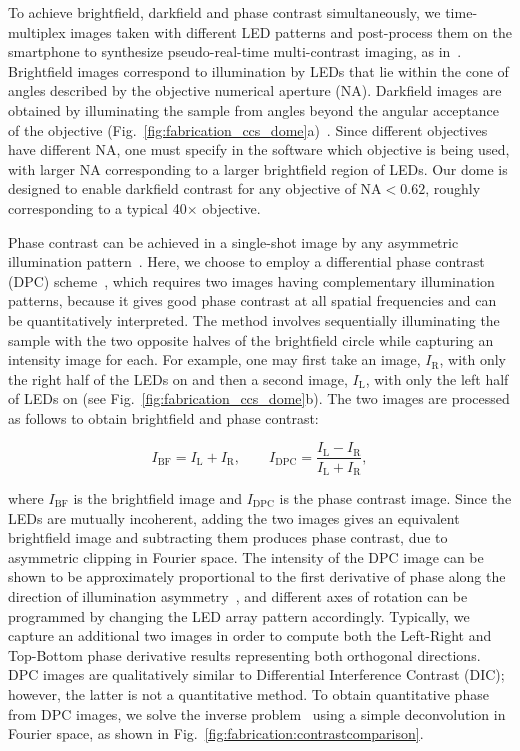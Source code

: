 To achieve brightfield, darkfield and phase contrast simultaneously, we time-multiplex images taken with different LED patterns and post-process them on the smartphone to synthesize pseudo-real-time multi-contrast imaging, as in~\cite{zijiMulti}. Brightfield images correspond to illumination by LEDs that lie within the cone of angles described by the objective numerical aperture (NA). Darkfield images are obtained by illuminating the sample from angles beyond the angular acceptance of the objective (Fig.~\ref{fig:fabrication_ccs_dome}a)~\cite{Zheng2011}. Since different objectives have different NA, one must specify in the software which objective is being used, with larger NA corresponding to a larger brightfield region of LEDs. Our dome is designed to enable darkfield contrast for any objective of NA$<0.62$, roughly corresponding to a typical 40$\times$ objective.

Phase contrast can be achieved in a single-shot image by any asymmetric illumination pattern~\cite{kachar1985asymmetric,Dodt01101999}. Here, we choose to employ a differential phase contrast (DPC) scheme~\cite{Hamilton1984a,mehta2009quantitative,Tian14,ford2012phase}, which requires two images having complementary illumination patterns, because it gives good phase contrast at all spatial frequencies and can be quantitatively interpreted. The method involves sequentially illuminating the sample with the two opposite halves of the brightfield circle while capturing an intensity image for each. For example, one may first take an image, $I_\mathrm{R}$, with only the right half of the LEDs on and then a second image, $I_\mathrm{L}$, with only the left half of LEDs on (see Fig.~\ref{fig:fabrication_ccs_dome}b). The two images are processed as follows to obtain brightfield and phase contrast:

\begin{equation}
I_{\mathrm{BF}}=I_\mathrm{L}+I_\mathrm{R}, \qquad I_{\mathrm{DPC}}= \frac{I_\mathrm{L}-I_\mathrm{R}}{I_\mathrm{L}+I_\mathrm{R}},
\label{IBF}
\end{equation}

\noindent where $I_{\mathrm{BF}}$ is the brightfield image and $I_{\mathrm{DPC}}$ is the phase contrast image. Since the LEDs are mutually incoherent, adding the two images gives an equivalent brightfield image and subtracting them produces phase contrast, due to asymmetric clipping in Fourier space. The intensity of the DPC image can be shown to be approximately proportional to the first derivative of phase along the direction of illumination asymmetry~\cite{Hamilton1984a}, and different axes of rotation can be programmed by changing the LED array pattern accordingly. Typically, we capture an additional two images in order to compute both the Left-Right and Top-Bottom phase derivative results representing both orthogonal directions. DPC images are qualitatively similar to Differential Interference Contrast (DIC); however, the latter is not a quantitative method. To obtain quantitative phase from DPC images, we solve the inverse problem~\cite{mehta2009quantitative,tian20153d} using a simple deconvolution in Fourier space, as shown in Fig.~\ref{fig:fabrication:contrastcomparison}.

